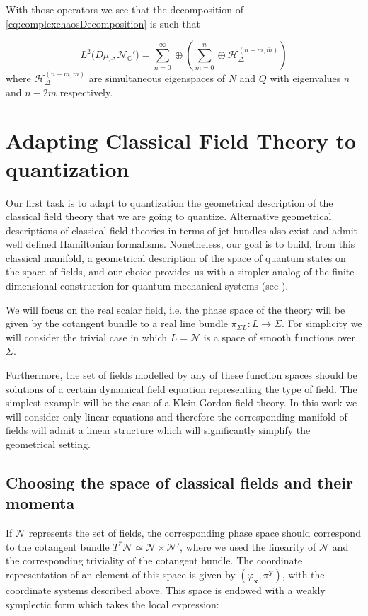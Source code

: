 \documentclass[12pt]{article}%
\begin{document}
With those operators we see that the decomposition of \eqref{eq:complexchaosDecomposition} is such that

\begin{equation}
\label{eq:descompositionCharge}
L^2\big(D\mu_c,{\mathcal{N}_{\mathbb{C}}'}\big)=\sum_{n=0}^\infty\oplus \left( \sum_{m=0}^n\oplus \mathcal{H}_\Delta^{(n-m,\bar{m})} \right)
\end{equation}
where $\mathcal{H}_\Delta^{(n-m,\bar{m})}$ are simultaneous eigenspaces of $N$ and $Q$ with eigenvalues $n$ and $n-2m$ respectively. 


\section{Adapting Classical Field Theory to quantization}
\label{sec:CFTQuantizar}
Our first task is to adapt to quantization the geometrical description of the classical field theory that we are going to quantize. Alternative geometrical descriptions of classical field theories in terms of jet bundles also exist and admit  well defined Hamiltonian formalisms. Nonetheless, our goal is to build, from this classical manifold, a geometrical description of the space of quantum states on the space of fields, and our choice provides us with a simpler analog of the finite dimensional construction for quantum mechanical systems (see \cite{Kibble1979}).

We will focus on the real scalar field, i.e. the phase space of the theory will be given by the cotangent bundle to a real line bundle $\pi_{\Sigma L}:L\to \Sigma$. For simplicity we will consider the trivial case in which $L=\mathcal{N}$ is a space of smooth functions over $\Sigma$.

Furthermore, the set of fields modelled by any of these function spaces should be solutions of a certain dynamical field equation representing the type of field. The simplest example will be the case of a Klein-Gordon field theory. In this work we will consider only linear equations and therefore the corresponding manifold of fields will admit a linear structure which will significantly simplify the geometrical setting. 

\subsection{Choosing the space of classical fields and their momenta}

If $\mathcal{N}$ represents the set of fields, the corresponding phase space should correspond to the cotangent bundle $T^*\mathcal{N}\simeq \mathcal{N}\times \mathcal{N}'$, where we used the linearity of $\mathcal{N}$ and the corresponding triviality of the cotangent bundle. The coordinate representation of an element of this space is given by $(\varphi_\mathbf{x},\pi^\mathbf{y})$, with the coordinate systems described above. This space is endowed with a weakly symplectic form  which takes the local expression:
\end{document}
